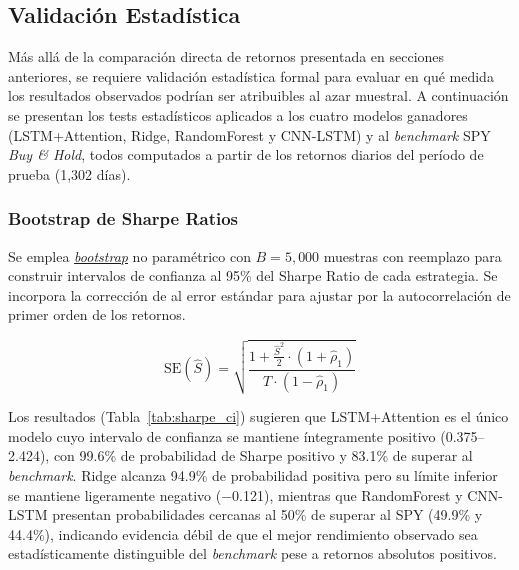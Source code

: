 
\subsection{Validaci\'on Estad\'istica}
\label{sec:statistical_validation}

M\'as all\'a de la comparaci\'on directa de retornos presentada en secciones anteriores, se requiere validaci\'on estad\'istica formal para evaluar en qu\'e medida los resultados observados podr\'ian ser atribuibles al azar muestral. A continuaci\'on se presentan los tests estad\'isticos aplicados a los cuatro modelos ganadores (LSTM+Attention, Ridge, RandomForest y CNN-LSTM) y al \textit{benchmark} SPY \textit{Buy \& Hold}, todos computados a partir de los retornos diarios del per\'iodo de prueba (1{,}302 d\'ias).

\subsubsection{Bootstrap de Sharpe Ratios}
\label{subsec:bootstrap_sharpe}

Se emplea \hyperlink{glos:bootstrap}{\textit{bootstrap}} no param\'etrico \citep{efron1979bootstrap} con $B = 5{,}000$ muestras con reemplazo para construir intervalos de confianza al 95\% del Sharpe Ratio de cada estrategia. Se incorpora la correcci\'on de \citet{lo2002} al error est\'andar para ajustar por la autocorrelaci\'on de primer orden de los retornos.

\begin{equation}
\text{SE}(\hat{S}) = \sqrt{\frac{1 + \frac{\hat{S}^2}{2} \cdot (1 + \hat{\rho}_1)}{T \cdot (1 - \hat{\rho}_1)}}
\label{eq:lo2002}
\end{equation}

Los resultados (Tabla~\ref{tab:sharpe_ci}) sugieren que LSTM+Attention es el \'unico modelo cuyo intervalo de confianza se mantiene \'integramente positivo (0.375--2.424), con 99.6\% de probabilidad de Sharpe positivo y 83.1\% de superar al \textit{benchmark}. Ridge alcanza 94.9\% de probabilidad positiva pero su l\'imite inferior se mantiene ligeramente negativo ($-$0.121), mientras que RandomForest y CNN-LSTM presentan probabilidades cercanas al 50\% de superar al SPY (49.9\% y 44.4\%), indicando evidencia d\'ebil de que el mejor rendimiento observado sea estad\'isticamente distinguible del \textit{benchmark} pese a retornos absolutos positivos.

